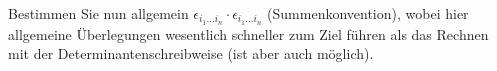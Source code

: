 \begin{atiTask}[
  title = Levi-Civita in n-Dimensionen,
  call = Zusatzaufgabe,
]
\begin{atiSubtasks}
	\item Bestimmen Sie nun allgemein $\epsilon_{i_1\dots i_n}\cdot\epsilon_{i_1\dots i_n}$ (Summenkonvention), wobei hier allgemeine Überlegungen wesentlich schneller zum Ziel führen als das Rechnen mit der Determinantenschreibweise (ist aber auch möglich).
\end{atiSubtasks}

\end{atiTask}

\begin{atiSolution}
	
\end{atiSolution}